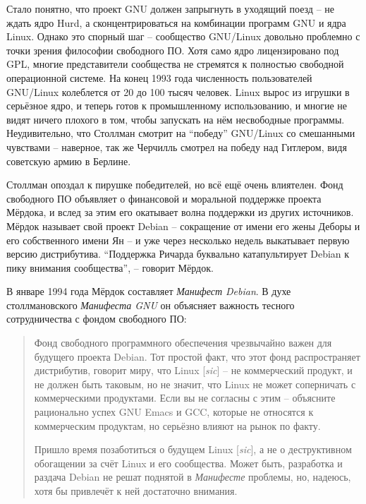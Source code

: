 Стало понятно, что проект GNU должен запрыгнуть в уходящий поезд -- не ждать ядро Hurd, а сконцентрироваться на комбинации программ GNU и ядра Linux. Однако это спорный шаг -- сообщество GNU/Linux довольно проблемно с точки зрения философии свободного ПО. Хотя само ядро лицензировано под GPL, многие представители сообщества не стремятся к полностью свободной операционной системе. На конец 1993 года численность пользователей GNU/Linux колеблется от 20 до 100 тысяч человек.  Linux вырос из игрушки в серьёзное ядро, и теперь готов к промышленному использованию, и многие не видят ничего плохого в том, чтобы запускать на нём несвободные программы. Неудивительно, что Столлман смотрит на ``победу'' GNU/Linux со смешанными чувствами -- наверное, так же Черчилль смотрел на победу над Гитлером, видя советскую армию в Берлине.

Столлман опоздал к пирушке победителей, но всё ещё очень влиятелен. Фонд свободного ПО объявляет о финансовой и моральной поддержке проекта Мёрдока, и вслед за этим его окатывает волна поддержки из других источников. Мёрдок называет свой проект Debian -- сокращение от имени его жены Деборы и его собственного имени Ян -- и уже через несколько недель выкатывает первую версию дистрибутива. ``Поддержка Ричарда буквально катапультирует Debian к пику внимания сообщества'', -- говорит Мёрдок.

В январе 1994 года Мёрдок составляет \textit{Манифест Debian}. В духе столлмановского \textit{Манифеста GNU} он объясняет важность тесного сотрудничества с фондом свободного ПО:

\begin{quote}
Фонд свободного программного обеспечения чрезвычайно важен для будущего проекта Debian. Тот простой факт, что этот фонд распространяет дистрибутив, говорит миру, что Linux [\textit{sic}] -- не коммерческий продукт, и не должен быть таковым, но не значит, что Linux не может соперничать с коммерческими продуктами. Если вы не согласны с этим -- объясните рационально успех GNU Emacs и GCC, которые не относятся к коммерческим продуктам, но серьёзно влияют на рынок по факту.

Пришло время позаботиться о будущем Linux [\textit{sic}], а не о деструктивном обогащении за счёт Linux и его сообщества. Может быть, разработка и раздача Debian не решат поднятой в \textit{Манифесте} проблемы, но, надеюсь, хотя бы привлечёт к ней достаточно внимания.
\end{quote}

